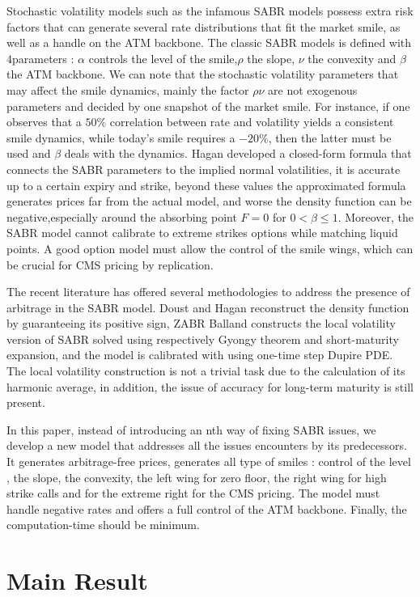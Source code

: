 \documentclass[10pt]{article}
\theoremstyle{plain}
\theoremstyle{definition}
\begin{document}
Stochastic volatility models such as the infamous SABR models possess extra risk factors that can generate several rate distributions that fit the market smile, as well as a handle on the ATM backbone. The classic SABR models is defined with $4$parameters : $\alpha$ controls the level of the smile,$\rho$ the slope, $\nu$ the convexity and $\beta$ the ATM backbone. We can note that the stochastic volatility parameters that may affect the smile dynamics, mainly the factor $\rho \nu$ are not exogenous parameters and decided by one snapshot of the market smile. For instance, if one observes that a $50\%$ correlation between rate and volatility yields a consistent smile dynamics, while today's smile requires a $-20 \%$, then the latter must be used and $\beta$ deals with the dynamics. Hagan developed a closed-form formula that connects the SABR parameters to the implied normal volatilities, it is accurate up to a certain expiry and strike, beyond these values the approximated formula generates prices far from the actual model, and worse the density function can be negative,especially around the absorbing point $F=0$ for $0<\beta \leq 1$. Moreover, the SABR model cannot calibrate to extreme strikes options while matching liquid points. A good option model must allow the control of the smile wings, which can be crucial for CMS pricing by replication. 

The recent literature has offered several methodologies to address the presence of arbitrage in the SABR model. Doust and Hagan reconstruct the density function by guaranteeing its positive sign, ZABR Balland constructs the local volatility version
of SABR solved using respectively Gyongy theorem and short-maturity expansion, and the model is calibrated with using one-time step Dupire PDE. The local volatility construction is not a trivial task due to the calculation of its harmonic average, in addition, the issue of accuracy for long-term maturity is still present.

In this paper, instead of introducing an nth way of fixing SABR issues, we develop a new model that addresses all the issues encounters by its predecessors. It generates arbitrage-free prices, generates all type of smiles : control of the level , the slope, the convexity, the left wing for zero floor, the right wing for high strike calls and for the extreme right for the CMS pricing. The model must handle negative rates and offers a full control of the ATM backbone. Finally, the computation-time should be minimum. 
 
\section{Main Result}
\end{document}
